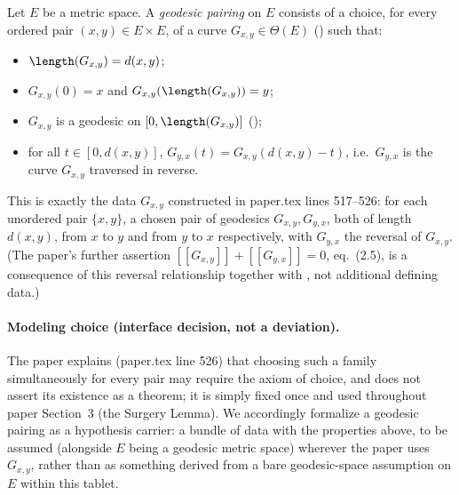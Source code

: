 \begin{definition}
  Let $E$ be a metric space. A \emph{geodesic pairing} on $E$ consists of a choice, for every
  ordered pair $(x,y) \in E \times E$, of a curve $G_{x,y} \in \Theta(E)$ () such
  that:
  \begin{itemize}
    \item $\length(G_{x,y}) = d(x,y)$;
    \item $G_{x,y}(0) = x$ and $G_{x,y}(\length(G_{x,y})) = y$;
    \item $G_{x,y}$ is a geodesic on $[0,\length(G_{x,y})]$ ();
    \item for all $t \in [0,d(x,y)]$, $G_{y,x}(t) = G_{x,y}(d(x,y)-t)$, i.e.\ $G_{y,x}$ is the
      curve $G_{x,y}$ traversed in reverse.
  \end{itemize}
  This is exactly the data $G_{x,y}$ constructed in paper.tex lines 517--526: for each unordered
  pair $\{x,y\}$, a chosen pair of geodesics $G_{x,y}, G_{y,x}$, both of length $d(x,y)$, from $x$
  to $y$ and from $y$ to $x$ respectively, with $G_{y,x}$ the reversal of $G_{x,y}$. (The paper's
  further assertion $[[G_{x,y}]]+[[G_{y,x}]]=0$, eq.~(2.5), is a consequence of this reversal
  relationship together with , not additional defining data.)

  \paragraph{Modeling choice (interface decision, not a deviation).} The paper explains
  (paper.tex line 526) that choosing such a family simultaneously for every pair may require the
  axiom of choice, and does not assert its existence as a theorem; it is simply fixed once and used
  throughout paper Section~3 (the Surgery Lemma). We accordingly formalize a geodesic pairing as a
  hypothesis carrier: a
  bundle of data with the properties above, to be assumed (alongside $E$ being a geodesic metric
  space) wherever the paper uses $G_{x,y}$, rather than as something derived from a bare
  geodesic-space assumption on $E$ within this tablet.
\end{definition}
